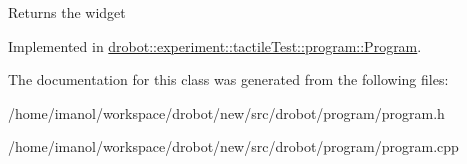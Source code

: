 \begin{DoxyReturn}{Returns}
the widget 
\end{DoxyReturn}


Implemented in \hyperlink{classdrobot_1_1experiment_1_1tactileTest_1_1program_1_1Program_a63c70e8e24bfc651d3be41680590303d}{drobot\-::experiment\-::tactile\-Test\-::program\-::\-Program}.



The documentation for this class was generated from the following files\-:\begin{DoxyCompactItemize}
\item 
/home/imanol/workspace/drobot/new/src/drobot/program/program.\-h\item 
/home/imanol/workspace/drobot/new/src/drobot/program/program.\-cpp\end{DoxyCompactItemize}
